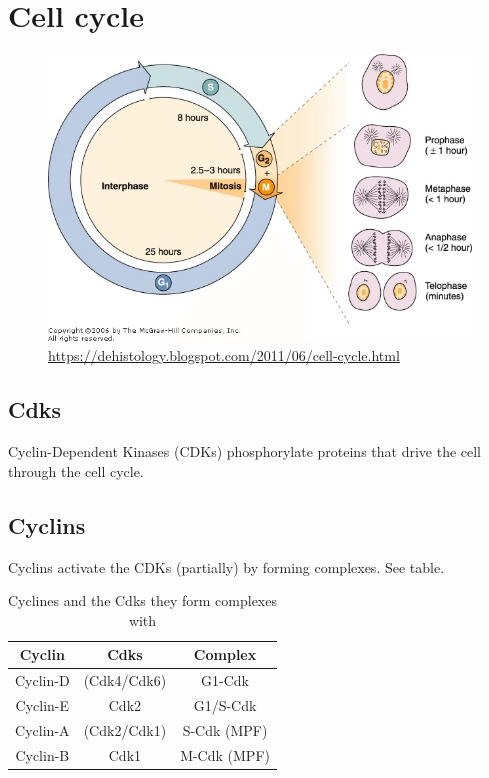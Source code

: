 \documentclass{article}
\begin{document}
	\section{Cell cycle}
	
	\begin{figure}[H]
		\centering
		\includegraphics[width=0.8\linewidth]{durations.jpg}
		\caption{\url{https://dehistology.blogspot.com/2011/06/cell-cycle.html}}
	\end{figure}
	
	\subsection{Cdks}
	Cyclin-Dependent Kinases (CDKs) phosphorylate proteins that drive the cell through the cell cycle. 
	
	\subsection{Cyclins}
	Cyclins activate the CDKs (partially) by forming complexes. See table.
	
	\begin{table}[h]
		\centering
		\begin{tabular}{|c|c|c|} \hline
			Cyclin & Cdks & Complex \\ \hline
			Cyclin-D & (Cdk4/Cdk6)  & G1-Cdk \\ \hline
			Cyclin-E & Cdk2         & G1/S-Cdk \\ \hline
			Cyclin-A & (Cdk2/Cdk1)  & S-Cdk (MPF) \\ \hline
			Cyclin-B & Cdk1         & M-Cdk (MPF)\\ \hline
		\end{tabular}
		\caption{Cyclines and the Cdks they form complexes with}
	\end{table}
\end{document}
